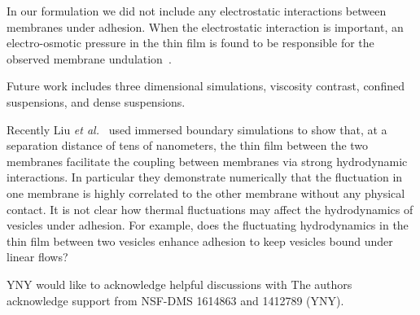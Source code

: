 \documentclass[prf,superscriptaddress,showpacs]{revtex4-1}
\begin{document}
In our formulation we did not include any electrostatic interactions
between membranes under adhesion. When the electrostatic interaction is
important, an electro-osmotic pressure in the thin film is found to be
responsible for the observed membrane undulation~\cite{SteinkuhlerAgudo-Canalejo2016_BJ}.

Future work includes three dimensional simulations, viscosity contrast,
confined suspensions, and dense suspensions.

Recently Liu {\em et al.}~\cite{LiuChuNewbyRead2018_bioRxiv} used
immersed boundary simulations to show that, at a separation distance of
tens of nanometers, the thin film between the two membranes facilitate
the coupling between membranes via strong hydrodynamic interactions. In
particular they demonstrate numerically that the fluctuation in one
membrane is highly correlated to the other membrane without any physical
contact. It is not clear how thermal fluctuations may affect the
hydrodynamics of vesicles under adhesion. For example, does the
fluctuating hydrodynamics in the thin film between two vesicles enhance
adhesion to keep vesicles bound under linear flows?

\acknowledgments

YNY would like to acknowledge helpful discussions with 
The authors acknowledge support from NSF-DMS 1614863 and 1412789 (YNY).
\end{document}
